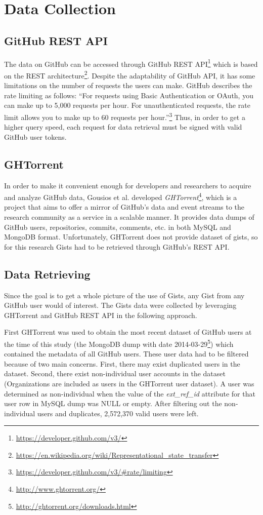 \section{Data Collection}

\subsection{GitHub REST API}
The data on GitHub can be accessed through GitHub REST API\footnote{\url{https://developer.github.com/v3/}} which is based on the REST architecture\footnote{\url{https://en.wikipedia.org/wiki/Representational_state_transfer}}. Despite the adaptability of GitHub API, it has some limitations on the number of requests the users can make. GitHub describes the rate limiting as follows: ``For requests using Basic Authentication or OAuth, you can make up to 5,000 requests per hour. For unauthenticated requests, the rate limit allows you to make up to 60 requests per hour.''\footnote{\url{https://developer.github.com/v3/\#rate/limiting}} Thus, in order to get a higher query speed, each request for data retrieval must be signed with valid GitHub user tokens.

\subsection{GHTorrent}
In order to make it convenient enough for developers and researchers to acquire and analyze GitHub data, Gousios et al. developed \textit{GHTorrent}\footnote{\url{http://www.ghtorrent.org/}}, which is a project that aims to offer a mirror of GitHub's data and event streams to the research community as a service in a scalable manner.\cite{6224294} It provides data dumps of GitHub users, repositories, commits, comments, etc. in both MySQL and MongoDB format. Unfortunately, GHTorrent does not provide dataset of gists, so for this research Gists had to be retrieved through GitHub's REST API. 

\subsection{Data Retrieving}
Since the goal is to get a whole picture of the use of Gists, any Gist from any GitHub user would of interest. The Gists data were collected by leveraging GHTorrent and GitHub REST API in the following approach. 

First GHTorrent was used to obtain the most recent dataset of GitHub users at the time of this study (the MongoDB dump with date 2014-03-29\footnote{\url{http://ghtorrent.org/downloads.html}}) which contained the metadata of all GitHub users. These user data had to be filtered because of two main concerns. First, there may exist duplicated users in the dataset. Second, there exist non-individual user accounts in the dataset (Organizations are included as users in the GHTorrent user dataset\cite{Kalliamvakou:2014:PPM:2597073.2597074}). A user was determined as non-individual when the value of the \textit{ext\_ref\_id} attribute for that user row in MySQL dump was NULL or empty. After filtering out the non-individual users and duplicates, 2,572,370 valid users were left. 

